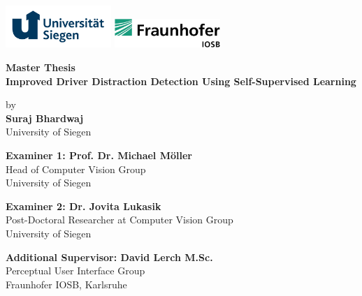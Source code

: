 \documentclass{report} %
\begin{document}
\begin{titlepage}
    \centering
    \includegraphics[width=0.3\textwidth]{UNIS-Dachmarke_rgb.jpg}\hfill
    \includegraphics[width=0.3\textwidth]{iosb_logo.png}
    \vspace{1.0cm}
    
    \Large{\textbf{Master Thesis}}\\
    \vspace{1.0cm}
    \Large{\textbf{Improved Driver Distraction Detection Using Self-Supervised Learning}}\\
    \vspace{1.0cm}
    
    \normalsize{by}\\
    \vspace{0.5cm}
    \large{\textbf{Suraj Bhardwaj}}\\
    \normalsize{University of Siegen}\\
    \vspace{1.0cm}
    
    \large{\textbf{Examiner 1: Prof. Dr. Michael Möller}}\\
    \normalsize{Head of Computer Vision Group}\\
    \normalsize{University of Siegen}\\
    \vspace{1.0cm}

    \large{\textbf{Examiner 2: Dr. Jovita Lukasik}}\\
    \normalsize{Post-Doctoral Researcher at Computer Vision Group}\\
    \normalsize{University of Siegen}\\
    \vspace{1.0cm}

    \large{\textbf{Additional Supervisor: David Lerch M.Sc.}}\\
    \normalsize{Perceptual User Interface Group}\\
    \normalsize{Fraunhofer IOSB, Karlsruhe}\\
    \vspace{1.5cm}
    

\end{titlepage}
\end{document}
